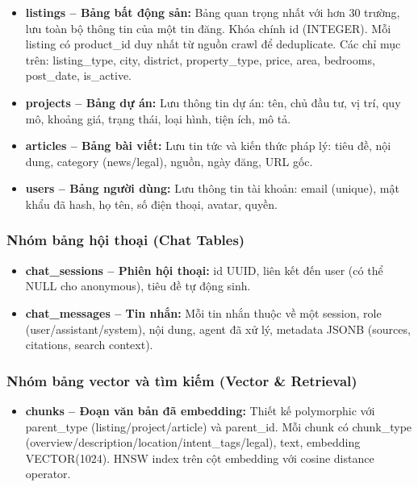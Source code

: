 \begin{itemize}
    \item \textbf{listings -- Bảng bất động sản:} Bảng quan trọng nhất với hơn 30 trường, lưu toàn bộ thông tin của một tin đăng. Khóa chính id (INTEGER). Mỗi listing có product\_id duy nhất từ nguồn crawl để deduplicate. Các chỉ mục trên: listing\_type, city, district, property\_type, price, area, bedrooms, post\_date, is\_active.

    \item \textbf{projects -- Bảng dự án:} Lưu thông tin dự án: tên, chủ đầu tư, vị trí, quy mô, khoảng giá, trạng thái, loại hình, tiện ích, mô tả.

    \item \textbf{articles -- Bảng bài viết:} Lưu tin tức và kiến thức pháp lý: tiêu đề, nội dung, category (news/legal), nguồn, ngày đăng, URL gốc.

    \item \textbf{users -- Bảng người dùng:} Lưu thông tin tài khoản: email (unique), mật khẩu đã hash, họ tên, số điện thoại, avatar, quyền.
\end{itemize}

\subsubsection{Nhóm bảng hội thoại (Chat Tables)}

\begin{itemize}
    \item \textbf{chat\_sessions -- Phiên hội thoại:} id UUID, liên kết đến user (có thể NULL cho anonymous), tiêu đề tự động sinh.
    \item \textbf{chat\_messages -- Tin nhắn:} Mỗi tin nhắn thuộc về một session, role (user/assistant/system), nội dung, agent đã xử lý, metadata JSONB (sources, citations, search context).
\end{itemize}

\subsubsection{Nhóm bảng vector và tìm kiếm (Vector \& Retrieval)}

\begin{itemize}
    \item \textbf{chunks -- Đoạn văn bản đã embedding:} Thiết kế polymorphic với parent\_type (listing/project/article) và parent\_id. Mỗi chunk có chunk\_type (overview/description/location/intent\_tags/legal), text, embedding VECTOR(1024). HNSW index trên cột embedding với cosine distance operator.
\end{itemize}

